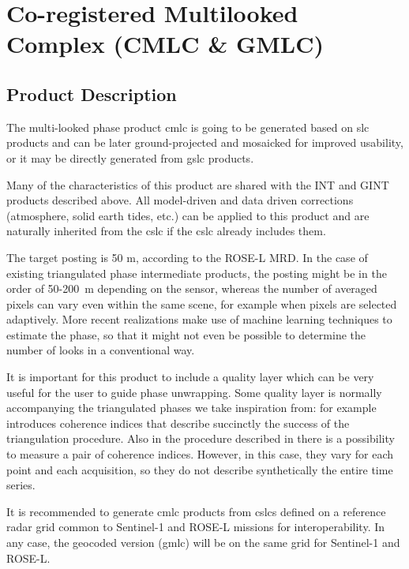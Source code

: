 \section{Co-registered Multilooked Complex (CMLC \& GMLC)}


\subsection{Product Description}

The multi-looked phase product \acs{cmlc} is going to be generated based on \acs{slc} products and can be later ground-projected and mosaicked for improved usability, or it may be directly generated from \acs{gslc} products.

Many of the characteristics of this product are shared with the INT and GINT products described above. All model-driven and data driven corrections (atmosphere, solid earth tides, etc.) can be applied to this product and are naturally inherited from the \acs{cslc} if the \acs{cslc} already includes them. 

The target posting is 50 m, according to the ROSE-L MRD. In the case of existing triangulated phase intermediate products, the posting might be in the order of 50-200~m depending on the sensor, whereas the number of averaged pixels can vary even within the same scene, for example when pixels are selected adaptively. More recent realizations make use of machine learning techniques to estimate the phase, so that it might not even be possible to determine the number of looks in a conventional way.

It is important for this product to include a quality layer which can be very useful for the user to guide phase unwrapping. Some quality layer is normally accompanying the triangulated phases we take inspiration from: for example \cite{Ferretti2011, Ansari2018} introduces coherence indices that describe succinctly the success of the triangulation procedure. Also in the procedure described in \cite{DeZan2022} there is a possibility to measure a pair of coherence indices. However, in this case, they vary for each point and each acquisition, so they do not describe synthetically the entire time series.

It is recommended to generate \acs{cmlc} products from \acs{cslc}s defined on a reference radar grid common to Sentinel-1 and ROSE-L missions for interoperability. In any case, the geocoded version (\acs{gmlc}) will be on the same grid for Sentinel-1 and ROSE-L.

